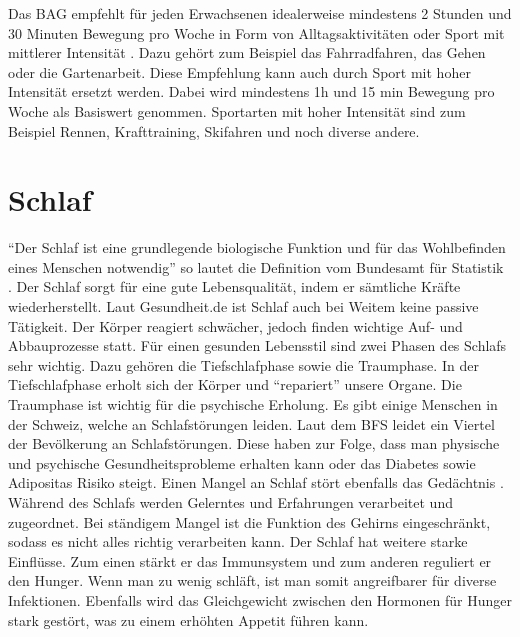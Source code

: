 \newline
Das BAG empfehlt für jeden Erwachsenen idealerweise mindestens 2 Stunden und 30 Minuten Bewegung pro Woche in Form von Alltagsaktivitäten oder Sport mit mittlerer Intensität \cite{bewegungsfoerderung}. Dazu gehört zum Beispiel das Fahrradfahren, das Gehen oder die Gartenarbeit. Diese Empfehlung kann auch durch Sport mit hoher Intensität ersetzt werden. Dabei wird mindestens 1h und 15 min Bewegung pro Woche als Basiswert genommen. Sportarten mit hoher Intensität sind zum Beispiel Rennen, Krafttraining, Skifahren und noch diverse andere. 
\section{Schlaf}
\authortoc{\bastian}{\sectionident}
“Der Schlaf ist eine grundlegende biologische Funktion und für das Wohlbefinden eines Menschen notwendig” so lautet die Definition vom Bundesamt für Statistik \cite{bundesamtfrstatistik_2015_schlafstoerungen}.
\newline
Der Schlaf sorgt für eine gute Lebensqualität, indem er sämtliche Kräfte wiederherstellt. Laut Gesundheit.de ist Schlaf auch bei Weitem keine passive Tätigkeit. Der Körper reagiert schwächer, jedoch finden wichtige Auf- und Abbauprozesse statt. Für einen gesunden Lebensstil sind zwei Phasen des Schlafs sehr wichtig. Dazu gehören die Tiefschlafphase sowie die Traumphase. In der Tiefschlafphase erholt sich der Körper und “repariert” unsere Organe. Die Traumphase ist wichtig für die psychische Erholung. Es gibt einige Menschen in der Schweiz, welche an Schlafstörungen leiden. Laut dem BFS leidet ein Viertel der Bevölkerung an Schlafstörungen. Diese haben zur Folge, dass man physische und psychische Gesundheitsprobleme erhalten kann oder das Diabetes sowie Adipositas Risiko steigt. Einen Mangel an Schlaf stört ebenfalls das Gedächtnis \cite{schlaf-grundbeduerfnis-und-lebenselixier}. Während des Schlafs werden Gelerntes und Erfahrungen verarbeitet und zugeordnet. Bei ständigem Mangel ist die Funktion des Gehirns eingeschränkt, sodass es nicht alles richtig verarbeiten kann. Der Schlaf hat weitere starke Einflüsse. Zum einen stärkt er das Immunsystem und zum anderen reguliert er den Hunger. Wenn man zu wenig schläft, ist man somit angreifbarer für diverse Infektionen. Ebenfalls wird das Gleichgewicht zwischen den Hormonen für Hunger stark gestört, was zu einem erhöhten Appetit führen kann.
